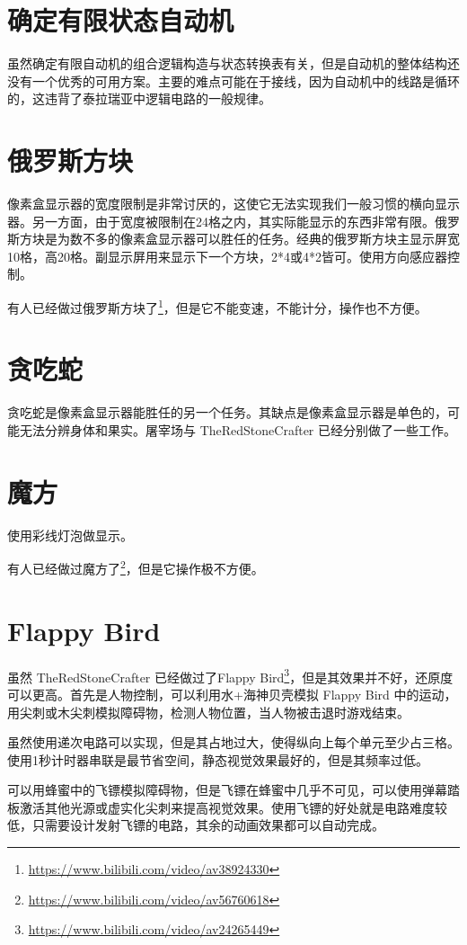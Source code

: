 \section{确定有限状态自动机}
虽然确定有限自动机的组合逻辑构造与状态转换表有关，但是自动机的整体结构还没有一个优秀的可用方案。主要的难点可能在于接线，因为自动机中的线路是循环的，这违背了泰拉瑞亚中逻辑电路的一般规律。

\section{俄罗斯方块}
像素盒显示器的宽度限制是非常讨厌的，这使它无法实现我们一般习惯的横向显示器。另一方面，由于宽度被限制在24格之内，其实际能显示的东西非常有限。俄罗斯方块是为数不多的像素盒显示器可以胜任的任务。经典的俄罗斯方块主显示屏宽10格，高20格。副显示屏用来显示下一个方块，2*4或4*2皆可。使用方向感应器控制。

有人已经做过俄罗斯方块了\footnote{\url{https://www.bilibili.com/video/av38924330}}，但是它不能变速，不能计分，操作也不方便。

\section{贪吃蛇}
贪吃蛇是像素盒显示器能胜任的另一个任务。其缺点是像素盒显示器是单色的，可能无法分辨身体和果实。屠宰场与 TheRedStoneCrafter 已经分别做了一些工作。

\section{魔方}
使用彩线灯泡做显示。

有人已经做过魔方了\footnote{\url{https://www.bilibili.com/video/av56760618}}，但是它操作极不方便。

\section{Flappy Bird}
虽然 TheRedStoneCrafter 已经做过了Flappy Bird\footnote{\url{https://www.bilibili.com/video/av24265449}}，但是其效果并不好，还原度可以更高。首先是人物控制，可以利用水+海神贝壳模拟 Flappy Bird 中的运动，用尖刺或木尖刺模拟障碍物，检测人物位置，当人物被击退时游戏结束。

虽然使用递次电路可以实现，但是其占地过大，使得纵向上每个单元至少占三格。使用1秒计时器串联是最节省空间，静态视觉效果最好的，但是其频率过低。

可以用蜂蜜中的飞镖模拟障碍物，但是飞镖在蜂蜜中几乎不可见，可以使用弹幕踏板激活其他光源或虚实化尖刺来提高视觉效果。使用飞镖的好处就是电路难度较低，只需要设计发射飞镖的电路，其余的动画效果都可以自动完成。

